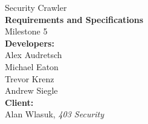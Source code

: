 \documentclass{article}
\begin{document}
\begin{titlepage}
    \begin{center}
        {\huge Security Crawler}\\
        \vspace{2cm}
        {\bf{\LARGE Requirements and Specifications}}\\
        {\LARGE Milestone 5}\\
        \vspace{9cm}
        {\Large \textbf{Developers:}\\ Alex Audretsch\\Michael Eaton\\Trevor Krenz\\Andrew Siegle}\\
        \vspace{2cm}
        {\Large \textbf{Client:} \\ Alan Wlasuk, \emph{403 Security}}

    \end{center}
\end{titlepage}
\tableofcontents
\newpage

\setcounter{page}{1}

\newpage

\newpage

\newpage

\newpage

\newpage

\printindex
\newpage

\end{document}
